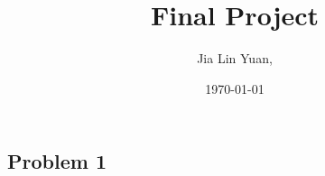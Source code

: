 \documentclass{article}
\title{Final Project}
\author{Jia Lin Yuan, }
\date\today
\begin{document}
\maketitle %

\section*{}
\newpage
\subsection*{Problem 1}
\end{document}

